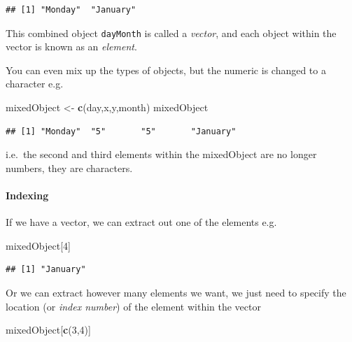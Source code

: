 \documentclass[
]{article}
\newenvironment{Shaded}{\begin{snugshade}}{\end{snugshade}}
\newcommand{\DecValTok}[1]{\textcolor[rgb]{0.00,0.00,0.81}{#1}}
\newcommand{\KeywordTok}[1]{\textcolor[rgb]{0.13,0.29,0.53}{\textbf{#1}}}
\newcommand{\NormalTok}[1]{#1}
\newcommand{\StringTok}[1]{\textcolor[rgb]{0.31,0.60,0.02}{#1}}
\begin{document}
\begin{verbatim}
## [1] "Monday"  "January"
\end{verbatim}

This combined object \texttt{dayMonth} is called a \emph{vector}, and
each object within the vector is known as an \emph{element}.

You can even mix up the types of objects, but the numeric is changed to
a character e.g.~

\begin{Shaded}
\begin{Highlighting}[]
\NormalTok{mixedObject <-}\StringTok{ }\KeywordTok{c}\NormalTok{(day,x,y,month)}
\NormalTok{mixedObject}
\end{Highlighting}
\end{Shaded}

\begin{verbatim}
## [1] "Monday"  "5"       "5"       "January"
\end{verbatim}

i.e.~the second and third elements within the mixedObject are no longer
numbers, they are characters.

\hypertarget{indexing}{%
\paragraph{Indexing}\label{indexing}}

If we have a vector, we can extract out one of the elements e.g.

\begin{Shaded}
\begin{Highlighting}[]
\NormalTok{mixedObject[}\DecValTok{4}\NormalTok{]}
\end{Highlighting}
\end{Shaded}

\begin{verbatim}
## [1] "January"
\end{verbatim}

Or we can extract however many elements we want, we just need to specify
the location (or \emph{index number}) of the element within the vector

\begin{Shaded}
\begin{Highlighting}[]
\NormalTok{mixedObject[}\KeywordTok{c}\NormalTok{(}\DecValTok{3}\NormalTok{,}\DecValTok{4}\NormalTok{)]}
\end{Highlighting}
\end{Shaded}
\end{document}
